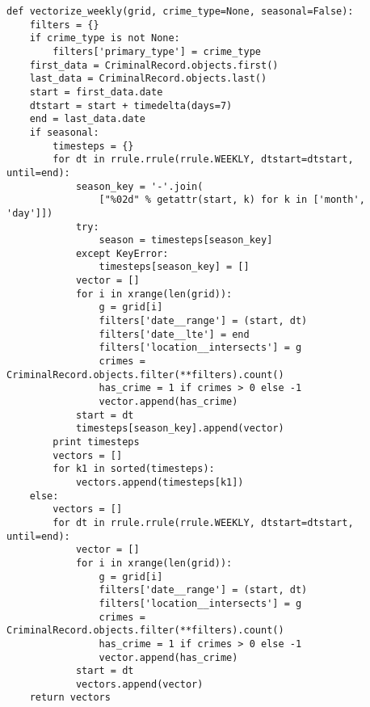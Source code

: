 \begin{small}
\begin{verbatim}
def vectorize_weekly(grid, crime_type=None, seasonal=False):
    filters = {}
    if crime_type is not None:
        filters['primary_type'] = crime_type
    first_data = CriminalRecord.objects.first()
    last_data = CriminalRecord.objects.last()
    start = first_data.date
    dtstart = start + timedelta(days=7)
    end = last_data.date
    if seasonal:
        timesteps = {}
        for dt in rrule.rrule(rrule.WEEKLY, dtstart=dtstart, until=end):
            season_key = '-'.join(
                ["%02d" % getattr(start, k) for k in ['month', 'day']])
            try:
                season = timesteps[season_key]
            except KeyError:
                timesteps[season_key] = []
            vector = []
            for i in xrange(len(grid)):
                g = grid[i]
                filters['date__range'] = (start, dt)
                filters['date__lte'] = end
                filters['location__intersects'] = g
                crimes = CriminalRecord.objects.filter(**filters).count()
                has_crime = 1 if crimes > 0 else -1
                vector.append(has_crime)
            start = dt
            timesteps[season_key].append(vector)
        print timesteps
        vectors = []
        for k1 in sorted(timesteps):
            vectors.append(timesteps[k1])
    else:
        vectors = []
        for dt in rrule.rrule(rrule.WEEKLY, dtstart=dtstart, until=end):
            vector = []
            for i in xrange(len(grid)):
                g = grid[i]
                filters['date__range'] = (start, dt)
                filters['location__intersects'] = g
                crimes = CriminalRecord.objects.filter(**filters).count()
                has_crime = 1 if crimes > 0 else -1
                vector.append(has_crime)
            start = dt
            vectors.append(vector)
    return vectors
\end{verbatim}
\end{small}